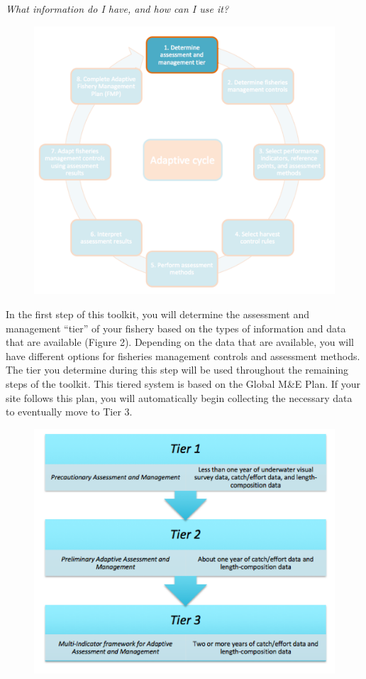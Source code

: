 \documentclass[]{book}
\begin{document}
\emph{What information do I have, and how can I use it?}

\begin{figure}
\centering
\includegraphics{myMediaFolder/media/Step1.png}
\caption{}
\end{figure}

In the first step of this toolkit, you will determine the assessment and
management ``tier'' of your fishery based on the types of information
and data that are available (Figure 2). Depending on the data that are
available, you will have different options for fisheries management
controls and assessment methods. The tier you determine during this step
will be used throughout the remaining steps of the toolkit. This tiered
system is based on the Global M\&E Plan. If your site follows this plan,
you will automatically begin collecting the necessary data to eventually
move to Tier 3.

\begin{figure}
\centering
\includegraphics{myMediaFolder/media/Tiers.png}
\caption{}
\end{figure}
\end{document}
